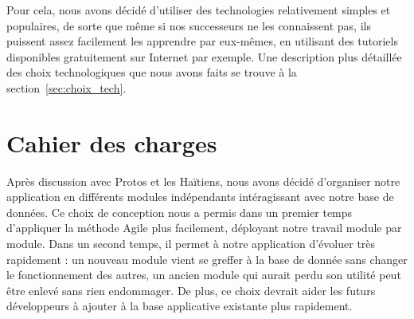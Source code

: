 \documentclass{EPL-master-thesis-covers-FR}
\begin{document}
				Pour cela, nous avons décidé d'utiliser des technologies relativement simples et populaires, de sorte que même si nos successeurs ne les connaissent pas, ils puissent assez facilement les apprendre par eux-mêmes, en utilisant des tutoriels disponibles gratuitement sur Internet par exemple. Une description plus détaillée des choix technologiques que nous avons faits se trouve à la section~\ref{sec:choix_tech}.

		\section{Cahier des charges}
			\label{sec:cahier_des_charges}

			Après discussion avec Protos et les Haïtiens, nous avons décidé d'organiser notre application en différents modules indépendants intéragissant avec notre base de données. Ce choix de conception nous a permis dans un premier temps d'appliquer la méthode Agile plus facilement, déployant notre travail module par module. Dans un second temps, il permet à notre application d'évoluer très rapidement : un nouveau module vient se greffer à la base de donnée sans changer le fonctionnement des autres, un ancien module qui aurait perdu son utilité peut être enlevé sans rien endommager. De plus, ce choix devrait aider les futurs développeurs à ajouter à la base applicative existante plus rapidement.
\end{document}
